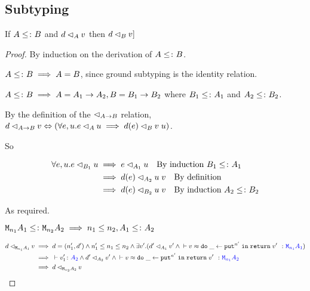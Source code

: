 \documentclass{Report}
\begin{document}
\subsection{Subtyping}

\begin{theorem}
    If $A\leq\colon B$ and $d \lhd_{A} v$ then $d \lhd_{B} v]$
\end{theorem}

\begin{proof}
    By induction on the derivation of $A\leq\colon B$.

    \case{\sground}
        $A\leq\colon B\implies A = B$, since ground subtyping is the identity relation.

    \case{\sfun}
        $A\leq\colon B\implies A = A_1\rightarrow A_2, B = B_1\rightarrow B_2$ where $B_1\leq\colon A_1$ and $A_2\leq\colon B_2$.

        By the definition of the $\lhd_{A\rightarrow B}$ relation, $\logRel{d}{\ab}{v} \Leftrightarrow (\forall e, u. \logRel{e}{A}{u}\implies \logRel{d(e)}{B}{\apply{v}{u}})$.

        So 

        \begin{align}
            \forall e, u. e \lhd_{B_1} u & \implies e \lhd_{A_1} u \quad\text{By induction $B_1\leq\colon A_1$}\\
            & \implies d(e) \lhd_{A_2} u\; v\quad\text{By definition}\\
            & \implies d(e) \lhd_{B_2} u\; v\quad\text{By induction $A_2\leq\colon B_2$}
        \end{align}

        As required.
    \case{\seffect}

    $\texttt{M}_{n_1}{A_1} \leq\colon \texttt{M}_{n_2}{A_2} \implies n_1\leq n_2, A_1\leq\colon A_2$

    \begin{align}
        \logRel{d}{\M{n_1}{A_1}}{v} & \implies  d=(n_1', d') \wedge n_1' \leq n_1\leq n_2 \wedge \exists v'. (\logRel{d'}{A_1}{v'} \wedge\zberelation{v}{\doin{\_}{\put^{n'}}{\return{v'}}}{\M{n_1}{A_1}})\\
        & \implies \ztyperelation{v_1'}{A_2} \wedge \logRel{d'}{A_2}{v'} \wedge \zberelation{v}{\doin{\_}{\put^{n'}}{\return{v'}}}{\M{n_1}{A_2}}\\
        & \implies \logRel{d}{\M{n_2}{A_2}}{v}
    \end{align}
\end{proof}
\end{document}
